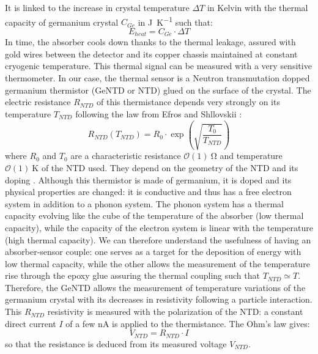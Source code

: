 It is linked to the increase in crystal temperature $\Delta T$ in Kelvin with the thermal capacity of germanium crystal $C_{Ge}$ in \si{\joule\per\kelvin} such that:
\begin{equation}
E_{heat} = C_{Ge} \cdot \Delta T
\end{equation}
In time, the absorber cools down thanks to the thermal leakage, assured with gold wires between the detector and its copper chassis maintained at constant cryogenic temperature.
This thermal signal can be measured with a very sensitive thermometer. In our case, the thermal sensor is a Neutron transmutation dopped germanium thermistor (GeNTD or NTD) glued on the surface of the crystal. The electric resistance $R_{NTD}$ of this thermistance depends very strongly on its temperature $T_{NTD}$ following the law from Efros and Shllovskii \cite{Mathimalar:2014sfa}:
\begin{equation}
\label{eq:ntd-resistivity}
R_{NTD}(T_{NTD}) = R_0 \cdot \exp(\sqrt{\frac{T_0}{T_{NTD}}})
\end{equation}
where $R_0$ and $T_0$ are a characteristic resistance $\mathcal{O}(1)\ \si{\ohm}$ and temperature $\mathcal{O}(1)\ \si{\kelvin}$ of the NTD used. They depend on the geometry of the NTD and its doping \cite{Mathimalar:2014sfa}. 
Although this thermistor is made of germanium, it is doped and its physical properties are changed: it is conductive and thus has a free electron system in addition to a phonon system. The phonon system has a thermal capacity evolving like the cube of the temperature of the absorber (low thermal capacity), while the capacity of the electron system is linear with the temperature (high thermal capacity). We can therefore understand the usefulness of having an absorber-sensor couple: one serves as a target for the deposition of energy with low thermal capacity, while the other allows the measurement of the temperature rise through the epoxy glue assuring the thermal coupling such that $T_{NTD} \simeq T$.
Therefore, the GeNTD allows the measurement of temperature variations of the germanium crystal with its decreases in resistivity following a particle interaction.
This $R_{NTD}$ resistivity is measured with the polarization of the NTD: a constant direct current $I$ of a few \si{\nano\ampere} is applied to the  thermistance. The Ohm's law gives:
\begin{equation}
\label{eq:ohm-law}
V_{NTD} = R_{NTD} \cdot I
\end{equation}
so that the resistance is deduced from its measured voltage $V_{NTD}$.

